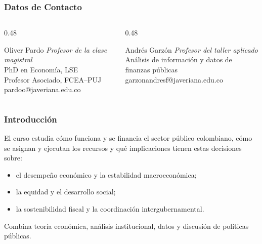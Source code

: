 \begin{frame}
  \frametitle{Datos de Contacto}
  \begin{columns}[T,onlytextwidth]
    \begin{column}{0.48\textwidth}
      \begin{block}{Oliver Pardo}
        \textit{Profesor de la clase magistral}\\[0.15cm]
        PhD en Econom\'ia, LSE\\
        Profesor Asociado, FCEA--PUJ\\[0.2cm]
        pardoo@javeriana.edu.co
      \end{block}
    \end{column}
    \begin{column}{0.48\textwidth}
      \begin{block}{Andr\'es Garz\'on}
        \textit{Profesor del taller aplicado}\\[0.15cm]
        An\'alisis de informaci\'on y datos de finanzas p\'ublicas\\[0.2cm]
        garzonandresf@javeriana.edu.co
      \end{block}
    \end{column}
  \end{columns}
\end{frame}


\begin{frame}
  \frametitle{Introducci\'on}
  El curso estudia c\'omo funciona y se financia el sector p\'ublico colombiano, c\'omo se asignan y ejecutan los recursos y qu\'e implicaciones tienen estas decisiones sobre:
  \begin{itemize}
    \item el desempe\~no econ\'omico y la estabilidad macroecon\'omica;
    \item la equidad y el desarrollo social;
    \item la sostenibilidad fiscal y la coordinaci\'on intergubernamental.
  \end{itemize}
  Combina teor\'ia econ\'omica, an\'alisis institucional, datos y discusi\'on de pol\'iticas p\'ublicas.
\end{frame}

